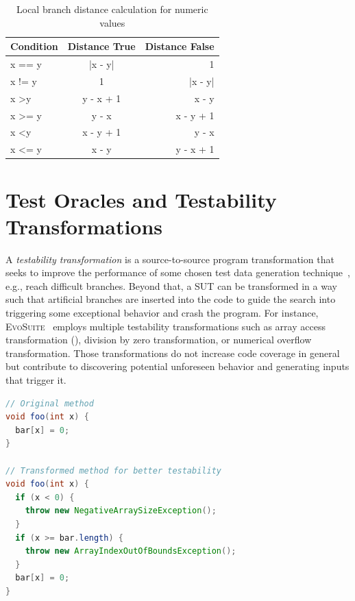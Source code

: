 \documentclass[paper=a4,%
  twoside,%
  BCOR4mm,%
  abstract=true,%
  toc=bibliography,%
  chapterprefix=true,%
  toc=bibliographynumbered,%
  open=right,%
  english,%
  pagesize=pdftex]{scrreprt}
\newcommand{\sut}{\ac{SUT}\xspace}
\begin{document}
\begin{table}[]
\centering
\begin{tabular}{lcr}
\hline
\textbf{Condition}  & \textbf{Distance True} & \textbf{Distance False} \\
\hline
x == y              & |x - y|                & 1                       \\
x != y              & 1                      & |x - y|                 \\
x \textgreater y    & y - x + 1              & x - y                   \\
x \textgreater{}= y & y - x                  & x - y + 1               \\
x \textless y       & x - y + 1              & y - x                   \\
x \textless{}= y    & x - y                  & y - x + 1               \\ \hline
\end{tabular}
\caption{Local branch distance calculation for numeric values}
\label{tab:local-branch-distance-formulas}
\end{table}

\section{Test Oracles and Testability Transformations}
\label{sec:testability-transformations}
A \emph{testability transformation} is a source-to-source program transformation that seeks to improve the performance of some chosen test data generation technique~\cite{Harman2004}, e.g., reach difficult branches. Beyond that, a \sut can be transformed in a way such that artificial branches are inserted into the code to guide the search into triggering some exceptional behavior and crash the program. For instance, \textsc{EvoSuite}~\cite{Fraser2013} employs multiple testability transformations such as array access transformation (), division by zero transformation, or numerical overflow transformation. Those transformations do not increase code coverage in general but contribute to discovering potential unforeseen behavior and generating inputs that trigger it.

\begin{lstlisting}[language=Java, style=boxed, caption={Array access transformation in \textsc{EvoSuite} for Java}, label=lst:evosuite-array-access-transformation]
// Original method
void foo(int x) {
  bar[x] = 0;
}

// Transformed method for better testability
void foo(int x) {
  if (x < 0) {
    throw new NegativeArraySizeException();
  }
  if (x >= bar.length) {
    throw new ArrayIndexOutOfBoundsException();
  }
  bar[x] = 0;
}
\end{lstlisting}
\end{document}
